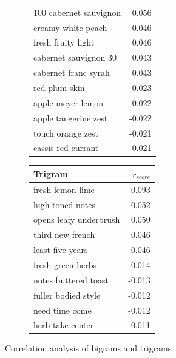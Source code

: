 \documentclass[12pt]{IEEEtran}
\begin{document}
\begin{figure}[h]
\begin{subfigure}{\columnwidth}
\begin{tabular}{ |l|r| }
        100 cabernet sauvignon & 0.056 \\
        creamy white peach & 0.046 \\
        fresh fruity light & 0.046 \\
        cabernet sauvignon 30 & 0.043 \\
        cabernet franc syrah & 0.043 \\
        \hline
        red plum skin & -0.023 \\
        apple meyer lemon & -0.022 \\
        apple tangerine zest & -0.022 \\
        touch orange zest & -0.021 \\
        cassis red currant & -0.021 \\

        \hline
    \end{tabular}
    \end{subfigure}
    \begin{subfigure}{\columnwidth}
    \centering
    \small
    \begin{tabular}{ |l|r| }
        \hline
        Trigram & $r_{score}$ \\
        \hline
        \hline
        fresh lemon lime & 0.093 \\
        high toned notes & 0.052 \\
        opens leafy underbrush & 0.050 \\
        third new french & 0.046 \\
        least five years & 0.046 \\
        \hline
        fresh green herbs & -0.014 \\
        notes buttered toast & -0.013 \\
        fuller bodied style & -0.012 \\
        need time come & -0.012 \\
        herb take center & -0.011 \\
        \hline
    \end{tabular}
    \end{subfigure}
    \caption{Correlation analysis of bigrams and trigrams}
    \label{correlation_cont}
\end{figure}
\end{document}
